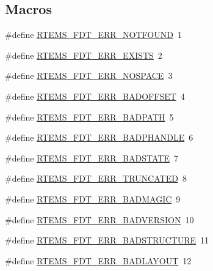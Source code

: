 \subsection*{Macros}
\begin{DoxyCompactItemize}
\item 
\#define \mbox{\hyperlink{rtems-fdt_8h_a60c40da67e6383e601b3b92c267b0ab5}{R\+T\+E\+M\+S\+\_\+\+F\+D\+T\+\_\+\+E\+R\+R\+\_\+\+N\+O\+T\+F\+O\+U\+ND}}~1
\item 
\#define \mbox{\hyperlink{rtems-fdt_8h_a7077da16961f22b6a669f42e14754a19}{R\+T\+E\+M\+S\+\_\+\+F\+D\+T\+\_\+\+E\+R\+R\+\_\+\+E\+X\+I\+S\+TS}}~2
\item 
\#define \mbox{\hyperlink{rtems-fdt_8h_ac572292c1bf4b03caf1ed614297df75f}{R\+T\+E\+M\+S\+\_\+\+F\+D\+T\+\_\+\+E\+R\+R\+\_\+\+N\+O\+S\+P\+A\+CE}}~3
\item 
\#define \mbox{\hyperlink{rtems-fdt_8h_aa3fc1bbe15934b882af1366e96be49f7}{R\+T\+E\+M\+S\+\_\+\+F\+D\+T\+\_\+\+E\+R\+R\+\_\+\+B\+A\+D\+O\+F\+F\+S\+ET}}~4
\item 
\#define \mbox{\hyperlink{rtems-fdt_8h_a6408443266323215cd2616432644ab6f}{R\+T\+E\+M\+S\+\_\+\+F\+D\+T\+\_\+\+E\+R\+R\+\_\+\+B\+A\+D\+P\+A\+TH}}~5
\item 
\#define \mbox{\hyperlink{rtems-fdt_8h_a65317278a6c62afefc1d986c8c1686ad}{R\+T\+E\+M\+S\+\_\+\+F\+D\+T\+\_\+\+E\+R\+R\+\_\+\+B\+A\+D\+P\+H\+A\+N\+D\+LE}}~6
\item 
\#define \mbox{\hyperlink{rtems-fdt_8h_a750ba759dda889c4a66d6eaa232c878a}{R\+T\+E\+M\+S\+\_\+\+F\+D\+T\+\_\+\+E\+R\+R\+\_\+\+B\+A\+D\+S\+T\+A\+TE}}~7
\item 
\#define \mbox{\hyperlink{rtems-fdt_8h_aa7370489ac101a450c2fb9453a6f7d06}{R\+T\+E\+M\+S\+\_\+\+F\+D\+T\+\_\+\+E\+R\+R\+\_\+\+T\+R\+U\+N\+C\+A\+T\+ED}}~8
\item 
\#define \mbox{\hyperlink{rtems-fdt_8h_a1ade4d657298b170677b2a29f4e3c3b6}{R\+T\+E\+M\+S\+\_\+\+F\+D\+T\+\_\+\+E\+R\+R\+\_\+\+B\+A\+D\+M\+A\+G\+IC}}~9
\item 
\#define \mbox{\hyperlink{rtems-fdt_8h_af1335b18e4b59d15f05fc888cb2725dc}{R\+T\+E\+M\+S\+\_\+\+F\+D\+T\+\_\+\+E\+R\+R\+\_\+\+B\+A\+D\+V\+E\+R\+S\+I\+ON}}~10
\item 
\#define \mbox{\hyperlink{rtems-fdt_8h_ad6f0a6ee11fdd227e8e95088edfb4d8f}{R\+T\+E\+M\+S\+\_\+\+F\+D\+T\+\_\+\+E\+R\+R\+\_\+\+B\+A\+D\+S\+T\+R\+U\+C\+T\+U\+RE}}~11
\item 
\#define \mbox{\hyperlink{rtems-fdt_8h_a1c970b5dd3c0b17772fed719b4f606b2}{R\+T\+E\+M\+S\+\_\+\+F\+D\+T\+\_\+\+E\+R\+R\+\_\+\+B\+A\+D\+L\+A\+Y\+O\+UT}}~12

\end{DoxyCompactItemize}
